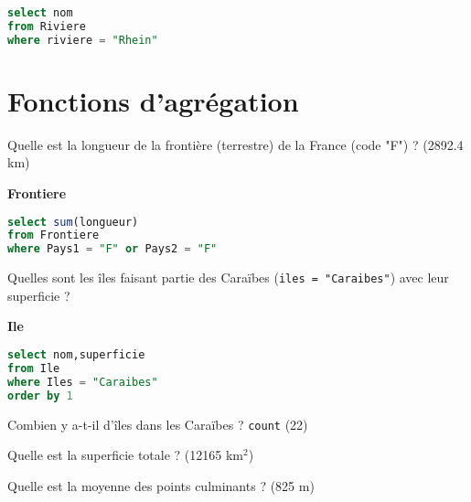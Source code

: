\begin{Answer}
\begin{lstlisting}[language=SQL]
select nom
from Riviere
where riviere = "Rhein"
\end{lstlisting}
\end{Answer}
\section{Fonctions d’agrégation}
\begin{Exercise}
Quelle est la longueur de la frontière (terrestre) de la France (code "F") ? (2892.4 km)
\end{Exercise}
{\bf Frontiere} 

\begin{Answer}
\begin{lstlisting}[language=SQL]
select sum(longueur)
from Frontiere 
where Pays1 = "F" or Pays2 = "F"
\end{lstlisting}
\end{Answer}
\begin{Exercise}
Quelles sont les îles faisant partie des Caraïbes ({\tt iles = "Caraibes"}) avec leur superficie ?
\end{Exercise}

{\bf Ile} 
\begin{Answer}
\begin{lstlisting}[language=SQL]
select nom,superficie
from Ile
where Iles = "Caraibes"
order by 1
\end{lstlisting}
\end{Answer}
\begin{Exercise}
Combien y a-t-il d'îles dans les Caraïbes ? \texttt{count} (22)

Quelle est la superficie totale ? (12165 km${}^2$)

Quelle est la moyenne des points culminants ? (825 m)
\end{Exercise}

